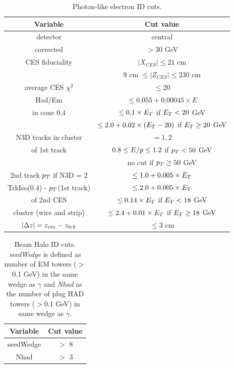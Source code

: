 \documentclass[11pt]{article}
\begin{document}
\begin{table}[hbm]
		\begin{center}
			\begin{tabular} {|c|c|}
				\hline
				\bf{Variable} 		& \bf{Cut value} 	\\
				\hline
				detector  		  	& central 	\\
				\hline
				corrected \et 	& $ >30 $ GeV \\
				\hline
				CES fiduciality 		& $ |X_{CES}| \leq 21 $ cm \\
								& $ 9 $ cm $ \leq |Z_{CES}| \leq 230 $ cm \\ 
				\hline
				average CES $ \chi^2 $	&  $ \leq 20 $ \\
				\hline
				Had/Em 		&	$ \leq 0.055 + 0.00045 \times E $ \\
				\hline
				\isoetcorr in cone 0.4	&	$ \leq 0.1 \times \mbox{$E_T$} $ if $ \mbox{$E_T$} < 20 $ GeV \\
									&	$ \leq 2.0 + 0.02 \times (\mbox{$E_T$} -20) $ if $ \mbox{$E_T$} \geq 20 $ GeV \\
				\hline
				N3D tracks in cluster	&	$= 1,2 $ \\
				\hline
				\eoverp of 1st track	& $0.8 \leq \mbox{$E/p$} \leq 1.2 $ if $ \mbox{$p_T$} < 50 $ GeV \\
									& no cut if $ \mbox{$p_T$} \geq 50 $ GeV \\
				\hline
				2nd track $\mbox{$p_T$}$ if N3D = 2	&	$ \leq 1.0 + 0.005 \times \mbox{$E_T$} $ \\
				\hline
				TrkIso($0.4$) - $\mbox{$p_T$}$(1st track) &	$ \leq 2.0 + 0.005 \times \mbox{$E_T$} $ \\
				\hline
				\et of 2nd CES			&	$ \leq 0.14 \times \mbox{$E_T$} $ if $ \mbox{$E_T$} < 18 $ GeV \\
				cluster (wire and strip)		&	$ \leq 2.4 + 0.01 \times \mbox{$E_T$} $ if $ \mbox{$E_T$} \geq 18 $ GeV \\
				\hline
				$|\Delta z| = z_{vtx} \-- z_{trk}$	&	$\leq 3$ cm	\\
				\hline

			\end{tabular}
		\end{center}
	\caption{Photon-like electron ID cuts.}
	\label{tab:pecuts}
\end{table}

\begin{table}[hbm]
\begin{center}
\begin{tabular} {|c|c|}
\hline
\bf{Variable} 		& \bf{Cut value} 	\\
\hline
seedWedge  		  	& $>$ 8 	\\
\hline
Nhad 	& $>$ 3\\
\hline
\end{tabular}
\end{center}
\caption{Beam Halo ID cuts. \textit{seedWedge} is defined as number of EM towers (\et$>$0.1 GeV) in the same wedge as $\gamma$ and \textit{Nhad} as the number of plug HAD towers (\et$>$0.1 GeV) in same wedge as $\gamma$.}
\label{tab:halocuts}
\end{table}
\end{document}
